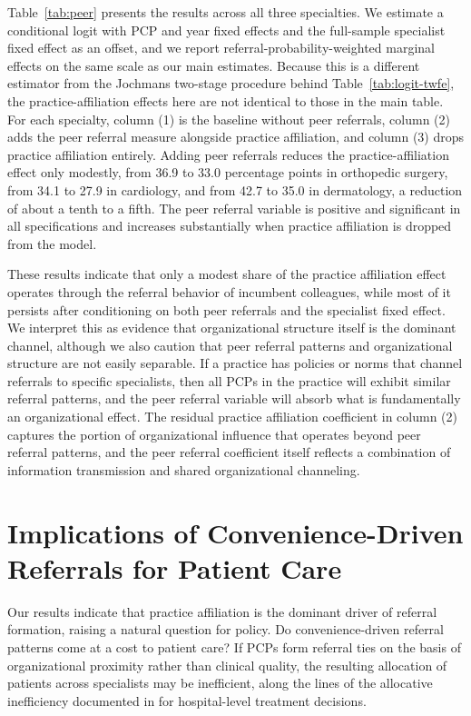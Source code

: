 \documentclass[12pt]{article}
\begin{document}
Table~\ref{tab:peer} presents the results across all three specialties. We estimate a conditional logit with PCP and year fixed effects and the full-sample specialist fixed effect as an offset, and we report referral-probability-weighted marginal effects on the same scale as our main estimates. Because this is a different estimator from the Jochmans two-stage procedure behind Table~\ref{tab:logit-twfe}, the practice-affiliation effects here are not identical to those in the main table. For each specialty, column (1) is the baseline without peer referrals, column (2) adds the peer referral measure alongside practice affiliation, and column (3) drops practice affiliation entirely. Adding peer referrals reduces the practice-affiliation effect only modestly, from 36.9 to 33.0 percentage points in orthopedic surgery, from 34.1 to 27.9 in cardiology, and from 42.7 to 35.0 in dermatology, a reduction of about a tenth to a fifth. The peer referral variable is positive and significant in all specifications and increases substantially when practice affiliation is dropped from the model.

These results indicate that only a modest share of the practice affiliation effect operates through the referral behavior of incumbent colleagues, while most of it persists after conditioning on both peer referrals and the specialist fixed effect. We interpret this as evidence that organizational structure itself is the dominant channel, although we also caution that peer referral patterns and organizational structure are not easily separable. If a practice has policies or norms that channel referrals to specific specialists, then all PCPs in the practice will exhibit similar referral patterns, and the peer referral variable will absorb what is fundamentally an organizational effect. The residual practice affiliation coefficient in column (2) captures the portion of organizational influence that operates beyond peer referral patterns, and the peer referral coefficient itself reflects a combination of information transmission and shared organizational channeling.



\section{Implications of Convenience-Driven Referrals for Patient Care}
\label{sec:welfare}

Our results indicate that practice affiliation is the dominant driver of referral formation, raising a natural question for policy. Do convenience-driven referral patterns come at a cost to patient care? If PCPs form referral ties on the basis of organizational proximity rather than clinical quality, the resulting allocation of patients across specialists may be inefficient, along the lines of the allocative inefficiency documented in \cite{chandra2020qje} for hospital-level treatment decisions.
\end{document}
